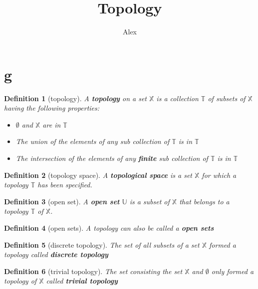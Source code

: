 \documentclass[twoside]{article}
\title{Topology}
\author{Alex}
\newtheorem{definition}{Definition}[section]
\begin{document}
      \tableofcontents

      \section{g}

            \begin{definition}[topology]
                  A \textit{\textbf{topology}} on a set $ \mathbb{X} $ is a collection $ \mathbb{T} $ of subsets of $ \mathbb{X} $ having the following properties:

                  \begin{itemize}
                        \item $ \emptyset $ and $ \mathbb{X} $ are in $ \mathbb{T} $
                        \item The union of the elements of any sub collection of $ \mathbb{T} $ is in $ \mathbb{T} $
                        \item The intersection of the elements of any \textbf{finite} sub collection of $ \mathbb{T} $ is in $ \mathbb{T} $
                  \end{itemize} 
            \end{definition}

            \begin{definition}[topology space]
                  A \textit{\textbf{topological space}} is a set $ \mathbb{X} $ for which a topology $ \mathbb{T} $ has been specified.
            \end{definition}
            
            \begin{definition}[open set]
                  A \textit{\textbf{open set}} $ \mathbb{U} $ is a subset of $ \mathbb{X} $ that belongs to a topology $ \mathbb{T} $ of $ \mathbb{X} $.
            \end{definition}
            
            \begin{definition}[open sets]
                  A topology can also be called a \textit{\textbf{open sets}}
            \end{definition}

            \begin{definition}[discrete topology]
                  The set of all subsets of a set $ \mathbb{X} $ formed a topology called \textit{\textbf{discrete topology}}
            \end{definition}

            \begin{definition}[trivial topology]
                  The set consisting the set $ \mathbb{X} $ and $ \emptyset $ only formed a topology of $ \mathbb{X} $ called \textit{\textbf{trivial topology}}
            \end{definition}
\end{document}
